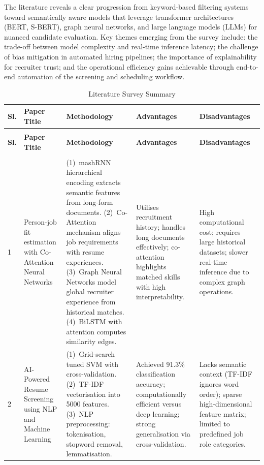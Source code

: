 \documentclass[12pt,a4paper]{report}
\begin{document}
The literature reveals a clear progression from keyword-based filtering systems toward semantically aware models that leverage transformer architectures (BERT, S-BERT), graph neural networks, and large language models (LLMs) for nuanced candidate evaluation. Key themes emerging from the survey include: the trade-off between model complexity and real-time inference latency; the challenge of bias mitigation in automated hiring pipelines; the importance of explainability for recruiter trust; and the operational efficiency gains achievable through end-to-end automation of the screening and scheduling workflow.

\begingroup
\setlength{\LTpre}{6pt}
\setlength{\LTpost}{6pt}
\begin{longtable}{|>{\centering\arraybackslash}p{0.6cm}|p{3.1cm}|p{3.6cm}|p{3.2cm}|p{3.2cm}|}
\caption{Literature Survey Summary}
\label{tab:litsurvey} \\
\hline
\textbf{Sl.} & \textbf{Paper Title} & \textbf{Methodology} & \textbf{Advantages} & \textbf{Disadvantages} \\
\hline
\endfirsthead
\multicolumn{5}{c}{\tablename~\thetable\ \textit{--- Continued from previous page}} \\
\hline
\textbf{Sl.} & \textbf{Paper Title} & \textbf{Methodology} & \textbf{Advantages} & \textbf{Disadvantages} \\
\hline
\endhead
\hline
\multicolumn{5}{r}{\textit{Continued on next page}} \\
\endfoot
\hline
\endlastfoot

1 &
Person-job fit estimation with Co-Attention Neural Networks \cite{ref1} &
(1)~mashRNN hierarchical encoding extracts semantic features from long-form documents. (2)~Co-Attention mechanism aligns job requirements with resume experiences. (3)~Graph Neural Networks model global recruiter experience from historical matches. (4)~BiLSTM with attention computes similarity edges. &
Utilises recruitment history; handles long documents effectively; co-attention highlights matched skills with high interpretability. &
High computational cost; requires large historical datasets; slower real-time inference due to complex graph operations. \\
\hline

2 &
AI-Powered Resume Screening using NLP and Machine Learning \cite{ref2} &
(1)~Grid-search tuned SVM with cross-validation. (2)~TF-IDF vectorisation into 5000 features. (3)~NLP preprocessing: tokenisation, stopword removal, lemmatisation. &
Achieved 91.3\% classification accuracy; computationally efficient versus deep learning; strong generalisation via cross-validation. &
Lacks semantic context (TF-IDF ignores word order); sparse high-dimensional feature matrix; limited to predefined job role categories. \\
\hline


\end{longtable}
\end{document}
